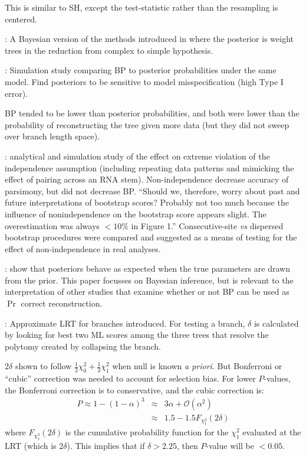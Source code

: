 \documentclass[11pt]{article}
\newcommand{\pvalue}{$P$-value\xspace}
\newcommand{\pvalues}{$P$-values\xspace}
\begin{document}
This is similar to SH, except the test-statistic rather than the resampling is centered.

\citet{ArisBrosou2003b}: A Bayesian version of the methods introduced in \citet{ArisBrosou2003} where the posterior is weight trees in the reduction from complex  to simple hypothesis.

\citet{ErixonSBO2003}: Simulation study comparing BP to posterior probabilities under the same model.
Find posteriors to be sensitive to model misspecification (high Type I error).

BP tended to be lower than posterior probabilities, and both were lower than the probability of reconstructing the tree given  more data (but they did not sweep over branch length space).


\citet{Galtier2004}: analytical and simulation study of the effect on extreme violation of the independence assumption (including repeating data patterns and mimicking the effect of pairing across an RNA stem).  Non-independence decrease accuracy of parsimony, but did not decrease BP.  ``Should we, therefore, worry about past and future interpretations of bootstrap scores? Probably not too much because the influence of nonindependence on the bootstrap score appears slight. The overestimation was always $<10\%$ in Figure 1.''  Consecutive-site {\em vs} dispersed bootstrap procedures were compared and suggested as a means of testing for the effect of non-independence in real analyses.

\citet{HuelsenbeckR2004}: show that posteriors behave as expected when the true parameters are drawn from the prior.  This paper focusses on Bayesian inference, but is relevant to the interpretation of other studies that examine whether or not BP can be used as $\Pr$ correct reconstruction.

\citet{AnisimovaG2006}: Approximate LRT for branches introduced. For testing a branch, $\delta$ is calculated by looking for best two ML scores among the three trees that resolve the polytomy created by collapsing the branch.

 $2\delta$ shown to follow $\frac{1}{2}\chi_0^2 + \frac{1}{2}\chi_1^2$ when null is known {\em a priori}.  But Bonferroni or ``cubic'' correction was needed to account for selection bias. For lower \pvalues, the Bonferroni correction is to conservative, and the cubic correction is:
\begin{eqnarray*}
	P  \approx 1 - (1-\alpha)^3 &\approx& 3\alpha + \mathcal{O}(\alpha^2)\\
	 &\approx& 1.5 - 1.5F_{\chi_1^2}(2\delta)
\end{eqnarray*}
where $F_{\chi_1^2}(2\delta)$ is the cumulative probability function for the $\chi_1^2$ evaluated at the LRT (which is 2$\delta$).
This implies that if $\delta > 2.25$, then \pvalue will be $<0.05$.
\end{document}
